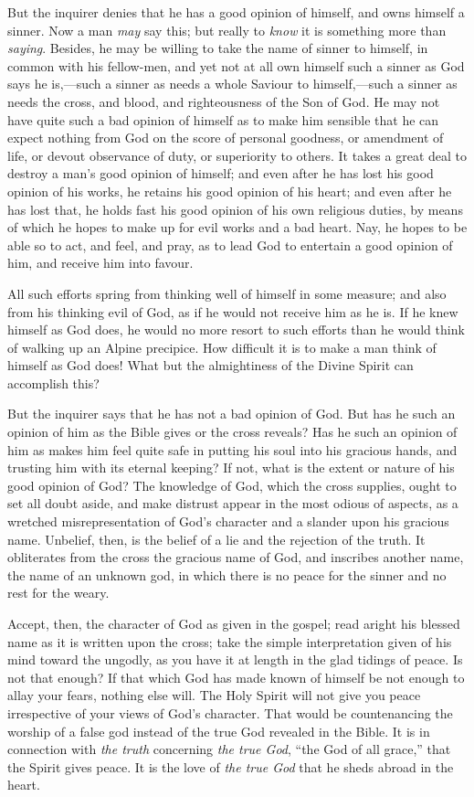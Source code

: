 \documentclass[
]{book}
\begin{document}
But the inquirer denies that he has a good opinion of himself, and owns himself a sinner. Now a man \emph{may} say this; but really to \emph{know} it is something more than \emph{saying}. Besides, he may be willing to take the name of sinner to himself, in common with his fellow-men, and yet not at all own himself such a sinner as God says he is,---such a sinner as needs a whole Saviour to himself,---such a sinner as needs the cross, and blood, and righteousness of the Son of God. He may not have quite such a bad opinion of himself as to make him sensible that he can expect nothing from God on the score of personal goodness, or amendment of life, or devout observance of duty, or superiority to others. It takes a great deal to destroy a man's good opinion of himself; and even after he has lost his good opinion of his works, he retains his good opinion of his heart; and even after he has lost that, he holds fast his good opinion of his own religious duties, by means of which he hopes to make up for evil works and a bad heart. Nay, he hopes to be able so to act, and feel, and pray, as to lead God to entertain a good opinion of him, and receive him into favour.

All such efforts spring from thinking well of himself in some measure; and also from his thinking evil of God, as if he would not receive him as he is. If he knew himself as God does, he would no more resort to such efforts than he would think of walking up an Alpine precipice. How difficult it is to make a man think of himself as God does! What but the almightiness of the Divine Spirit can accomplish this?

But the inquirer says that he has not a bad opinion of God. But has he such an opinion of him as the Bible gives or the cross reveals? Has he such an opinion of him as makes him feel quite safe in putting his soul into his gracious hands, and trusting him with its eternal keeping? If not, what is the extent or nature of his good opinion of God? The knowledge of God, which the cross supplies, ought to set all doubt aside, and make distrust appear in the most odious of aspects, as a wretched misrepresentation of God's character and a slander upon his gracious name. Unbelief, then, is the belief of a lie and the rejection of the truth. It obliterates from the cross the gracious name of God, and inscribes another name, the name of an unknown god, in which there is no peace for the sinner and no rest for the weary.

Accept, then, the character of God as given in the gospel; read aright his blessed name as it is written upon the cross; take the simple interpretation given of his mind toward the ungodly, as you have it at length in the glad tidings of peace. Is not that enough? If that which God has made known of himself be not enough to allay your fears, nothing else will. The Holy Spirit will not give you peace irrespective of your views of God's character. That would be countenancing the worship of a false god instead of the true God revealed in the Bible. It is in connection with \emph{the truth} concerning \emph{the true God}, ``the God of all grace,'' that the Spirit gives peace. It is the love of \emph{the true God} that he sheds abroad in the heart.
\end{document}

